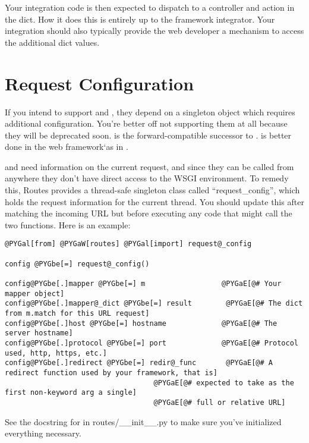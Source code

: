 \documentclass[letterpaper,10pt,english]{manual}
\begin{document}
Your integration code is then expected to dispatch to a controller and action
in the dict. How it does this is entirely up to the framework integrator. Your
integration should also typically provide the web developer a mechanism to
access the additional dict values.


\section{Request Configuration}

If you intend to support  and , they depend on a
singleton object which requires additional configuration.  You're better off
not supporting them at all because they will be deprecated soon.
 is the forward-compatible successor to .
 is better done in the web framework{}`as in
.

 and  need information on the current request,
and since they can be called from anywhere they don't have direct access to the
WSGI environment.  To remedy this, Routes provides a thread-safe singleton class
called ``request\_config'', which holds the request information for the current
thread. You should update this after matching the incoming URL but before
executing any code that might call the two functions.  Here is an example:

\begin{Verbatim}[commandchars=@\[\]]
@PYGal[from] @PYGaW[routes] @PYGal[import] request@_config

config @PYGbe[=] request@_config()

config@PYGbe[.]mapper @PYGbe[=] m                  @PYGaE[@# Your mapper object]
config@PYGbe[.]mapper@_dict @PYGbe[=] result        @PYGaE[@# The dict from m.match for this URL request]
config@PYGbe[.]host @PYGbe[=] hostname             @PYGaE[@# The server hostname]
config@PYGbe[.]protocol @PYGbe[=] port             @PYGaE[@# Protocol used, http, https, etc.]
config@PYGbe[.]redirect @PYGbe[=] redir@_func       @PYGaE[@# A redirect function used by your framework, that is]
                                   @PYGaE[@# expected to take as the first non-keyword arg a single]
                                   @PYGaE[@# full or relative URL]
\end{Verbatim}

See the docstring for  in routes/\_\_init\_\_.py to make sure
you've initialized everything necessary.
\end{document}
